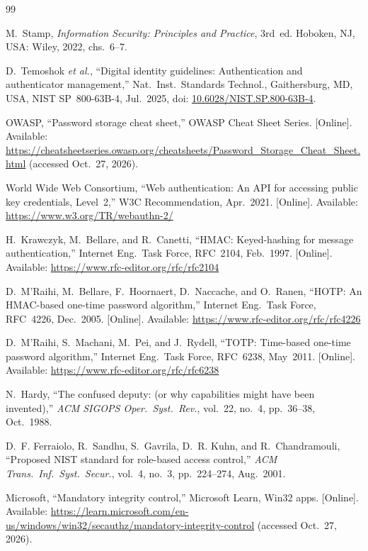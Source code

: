 \documentclass[11pt,a4paper]{article}
\begin{document}
\clearpage
\begin{thebibliography}{99}
\footnotesize\setlength{\itemsep}{1pt}\setlength{\parsep}{0pt}\setlength{\parskip}{0pt}

M.~Stamp, \emph{Information Security: Principles and Practice}, 3rd~ed. Hoboken, NJ, USA: Wiley, 2022, chs.~6--7.

D.~Temoshok \emph{et al.}, ``Digital identity guidelines: Authentication and authenticator management,'' Nat.\ Inst.\ Standards Technol., Gaithersburg, MD, USA, NIST SP~800-63B-4, Jul.~2025, doi: \href{https://doi.org/10.6028/NIST.SP.800-63B-4}{10.6028/NIST.SP.800-63B-4}.

OWASP, ``Password storage cheat sheet,'' OWASP Cheat Sheet Series. [Online]. Available: \url{https://cheatsheetseries.owasp.org/cheatsheets/Password_Storage_Cheat_Sheet.html} (accessed Oct.~27, 2026).

World Wide Web Consortium, ``Web authentication: An API for accessing public key credentials, Level~2,'' W3C Recommendation, Apr.~2021. [Online]. Available: \url{https://www.w3.org/TR/webauthn-2/}

H.~Krawczyk, M.~Bellare, and R.~Canetti, ``HMAC: Keyed-hashing for message authentication,'' Internet Eng.\ Task Force, RFC~2104, Feb.~1997. [Online]. Available: \url{https://www.rfc-editor.org/rfc/rfc2104}

D.~M'Raihi, M.~Bellare, F.~Hoornaert, D.~Naccache, and O.~Ranen, ``HOTP: An HMAC-based one-time password algorithm,'' Internet Eng.\ Task Force, RFC~4226, Dec.~2005. [Online]. Available: \url{https://www.rfc-editor.org/rfc/rfc4226}

D.~M'Raihi, S.~Machani, M.~Pei, and J.~Rydell, ``TOTP: Time-based one-time password algorithm,'' Internet Eng.\ Task Force, RFC~6238, May~2011. [Online]. Available: \url{https://www.rfc-editor.org/rfc/rfc6238}

N.~Hardy, ``The confused deputy: (or why capabilities might have been invented),'' \emph{ACM SIGOPS Oper.\ Syst.\ Rev.}, vol.~22, no.~4, pp.~36--38, Oct.~1988.

D.~F. Ferraiolo, R.~Sandhu, S.~Gavrila, D.~R. Kuhn, and R.~Chandramouli, ``Proposed NIST standard for role-based access control,'' \emph{ACM Trans.\ Inf.\ Syst.\ Secur.}, vol.~4, no.~3, pp.~224--274, Aug.~2001.

Microsoft, ``Mandatory integrity control,'' Microsoft Learn, Win32 apps. [Online]. Available: \url{https://learn.microsoft.com/en-us/windows/win32/secauthz/mandatory-integrity-control} (accessed Oct.~27, 2026).


\end{thebibliography}
\end{document}
